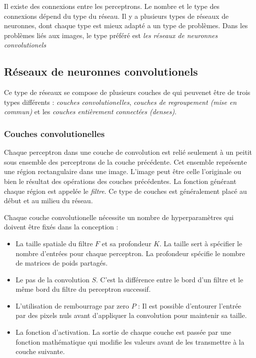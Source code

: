 Il existe des connexions entre les perceptrons. Le nombre et le type des
connexions dépend du type du réseau. Il y a plusieurs types de réseaux de
neuronnes, dont chaque type est mieux adapté a un type de problèmes. Dans les
problèmes liés aux images, le type préféré est \emph{les réseaux de neuronnes
convolutionels}

\subsection{Réseaux de neuronnes convolutionels}

Ce type de réseaux se compose de plusieurs couches de qui peuvenet être de trois
types différents : \emph{couches convolutionelles},
\emph{couches de regroupement (mise en commun)} et les
\emph{couches entièrement connectées (denses)}.

\subsubsection{Couches convolutionelles}

Chaque perceptron dans une couche de convolution est relié seulement à un peitit
sous ensemble des perceptrons de la couche précédente. Cet ensemble représente
une région rectangulaire dans une image. L'image peut être celle l'originale ou
bien le résultat des opérations des couches précédentes. La fonction générant
chaque région est appelée le \emph{filtre}. Ce type de couches est généralement
placé au début et au milieu du réseau.

Chaque couche convolutionelle nécessite un nombre de hyperparamètres qui doivent
être fixés dans la conception :

\begin{itemize}
  \item La taille spatiale du filtre $F$ et sa profondeur $K$. La taille sert à
  spécifier le nombre d'entrées pour chaque perceptron. La profondeur spécifie
  le nombre de matrices de poids partagés.
  \item Le pas de la convolution $S$. C'est la différence entre le bord d'un
  filtre et le même bord du filtre du perceptron successif.
  \item L'utilisation de rembourrage par zero $P$ : Il est possible d'entourer
  l'entrée par des pixels nuls avant d'appliquer la convolution pour maintenir
  sa taille.
  \item La fonction d'activation. La sortie de chaque couche est passée par une
  fonction mathématique qui modifie les valeurs avant de les transmettre à la
  couche suivante.
\end{itemize}

